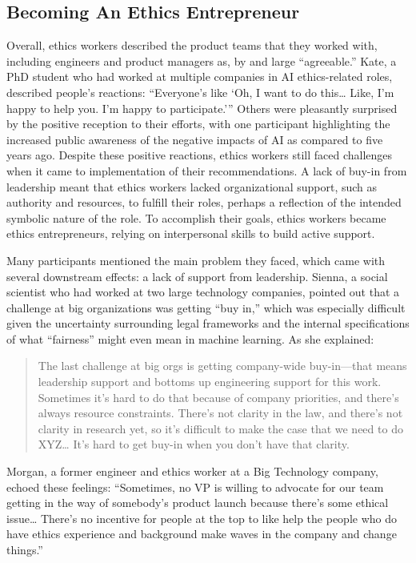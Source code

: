 \documentclass[sigconf]{acmart}
\begin{document}
\subsection{Becoming An Ethics Entrepreneur}

Overall, ethics workers described the product teams that they worked with, including engineers and product managers as, by and large “agreeable.” Kate, a PhD student who had worked at multiple companies in AI ethics-related roles, described people’s reactions: “Everyone’s like ‘Oh, I want to do this… Like, I’m happy to help you. I’m happy to participate.’” Others were pleasantly surprised by the positive reception to their efforts, with one participant highlighting the increased public awareness of the negative impacts of AI as compared to five years ago. Despite these positive reactions, ethics workers still faced challenges when it came to implementation of their recommendations. A lack of buy-in from leadership meant that ethics workers lacked organizational support, such as authority and resources, to fulfill their roles, perhaps a reflection of the intended symbolic nature of the role. To accomplish their goals, ethics workers became ethics entrepreneurs, relying on interpersonal skills to build active support. 

Many participants mentioned the main problem they faced, which came with several downstream effects: a lack of support from leadership. Sienna, a social scientist who had worked at two large technology companies, pointed out that a challenge at big organizations was getting “buy in,” which was especially difficult given the uncertainty surrounding legal frameworks and the internal specifications of what “fairness” might even mean in machine learning. As she explained:

\begin{quote}
The last challenge at big orgs is getting company-wide buy-in—that means leadership support and bottoms up engineering support for this work. Sometimes it’s hard to do that because of company priorities, and there’s always resource constraints. There’s not clarity in the law, and there’s not clarity in research yet, so it’s difficult to make the case that we need to do XYZ… It’s hard to get buy-in when you don’t have that clarity. 
\end{quote}

Morgan, a former engineer and ethics worker at a Big Technology company, echoed these feelings: “Sometimes, no VP is willing to advocate for our team getting in the way of somebody’s product launch because there’s some ethical issue… There’s no incentive for people at the top to like help the people who do have ethics experience and background make waves in the company and change things.”
\end{document}
